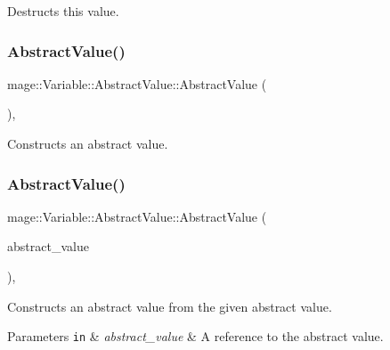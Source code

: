 Destructs this value. \hypertarget{structmage_1_1_variable_1_1_abstract_value_a0a96662d36697af8a17b88f6a2d8efca}{}\label{structmage_1_1_variable_1_1_abstract_value_a0a96662d36697af8a17b88f6a2d8efca} 
\subsubsection{\texorpdfstring{Abstract\+Value()}{AbstractValue()}\hspace{0.1cm}{\footnotesize\ttfamily [1/3]}}
{\footnotesize\ttfamily mage\+::\+Variable\+::\+Abstract\+Value\+::\+Abstract\+Value (\begin{DoxyParamCaption}{ }\end{DoxyParamCaption})\hspace{0.3cm}{\ttfamily [protected]}, {\ttfamily [default]}}

Constructs an abstract value. \hypertarget{structmage_1_1_variable_1_1_abstract_value_a09123ab568948a1a8bc7911c65fda422}{}\label{structmage_1_1_variable_1_1_abstract_value_a09123ab568948a1a8bc7911c65fda422} 
\subsubsection{\texorpdfstring{Abstract\+Value()}{AbstractValue()}\hspace{0.1cm}{\footnotesize\ttfamily [2/3]}}
{\footnotesize\ttfamily mage\+::\+Variable\+::\+Abstract\+Value\+::\+Abstract\+Value (\begin{DoxyParamCaption}\item[{const \hyperlink{structmage_1_1_variable_1_1_abstract_value}{Abstract\+Value} \&}]{abstract\+\_\+value }\end{DoxyParamCaption})\hspace{0.3cm}{\ttfamily [protected]}, {\ttfamily [default]}}

Constructs an abstract value from the given abstract value.


\begin{DoxyParams}[1]{Parameters}
\mbox{\tt in}  & {\em abstract\+\_\+value} & A reference to the abstract value. \\
\hline
\end{DoxyParams}
\hypertarget{structmage_1_1_variable_1_1_abstract_value_af2decac4e5b5b52c3e6973b39a2dec5b}{}\label{structmage_1_1_variable_1_1_abstract_value_af2decac4e5b5b52c3e6973b39a2dec5b} 
